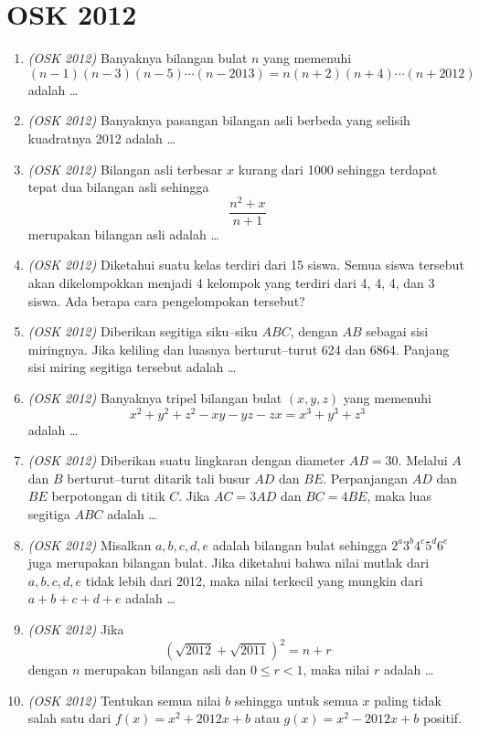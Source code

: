 \documentclass[11pt]{scrartcl}
\begin{document}
\newpage


\section{OSK 2012}

\begin{enumerate}
\item \textit{(OSK 2012)} Banyaknya bilangan bulat $n$ yang memenuhi  
$$(n-1)(n-3)(n-5)\cdots(n-2013) = n(n+2)(n+4)\cdots(n+2012)$$  
adalah \dots
\item \textit{(OSK 2012)} Banyaknya pasangan bilangan asli berbeda yang selisih kuadratnya 2012 adalah \dots
\item \textit{(OSK 2012)} Bilangan asli terbesar $x$ kurang dari 1000 sehingga terdapat tepat dua bilangan asli sehingga  
\[
\frac{n^2 + x}{n+1}
\]
merupakan bilangan asli adalah \dots

\item \textit{(OSK 2012)} Diketahui suatu kelas terdiri dari 15 siswa. Semua siswa tersebut akan dikelompokkan menjadi 4 kelompok yang terdiri dari 4, 4, 4, dan 3 siswa. Ada berapa cara pengelompokan tersebut?

\item \textit{(OSK 2012)} Diberikan segitiga siku–siku $ABC$, dengan $AB$ sebagai sisi miringnya. Jika keliling dan luasnya berturut–turut 624 dan 6864. Panjang sisi miring segitiga tersebut adalah \dots

\item \textit{(OSK 2012)} Banyaknya tripel bilangan bulat $(x,y,z)$ yang memenuhi  
\[
x^2 + y^2 + z^2 - xy - yz - zx = x^3 + y^3 + z^3
\]
adalah \dots

\item \textit{(OSK 2012)} Diberikan suatu lingkaran dengan diameter $AB = 30$. Melalui $A$ dan $B$ berturut–turut ditarik tali busur $AD$ dan $BE$. Perpanjangan $AD$ dan $BE$ berpotongan di titik $C$. Jika  
$AC = 3AD$ dan $BC = 4BE$, maka luas segitiga $ABC$ adalah \dots

\item \textit{(OSK 2012)} Misalkan $a,b,c,d,e$ adalah bilangan bulat sehingga $2^a 3^b 4^c 5^d 6^e$ juga merupakan bilangan bulat. Jika diketahui bahwa nilai mutlak dari $a,b,c,d,e$ tidak lebih dari 2012, maka nilai terkecil yang mungkin dari $a+b+c+d+e$ adalah \dots

\item \textit{(OSK 2012)} Jika  
\[
\left(\sqrt{2012} + \sqrt{2011}\right)^2 = n + r
\]
dengan $n$ merupakan bilangan asli dan $0 \le r < 1$, maka nilai $r$ adalah \dots
\item \textit{(OSK 2012)} Tentukan semua nilai $b$ sehingga untuk semua $x$ paling tidak salah satu dari  
$f(x)=x^2 + 2012x + b$ atau $g(x)=x^2 - 2012x + b$ positif.


\end{enumerate}
\end{document}
